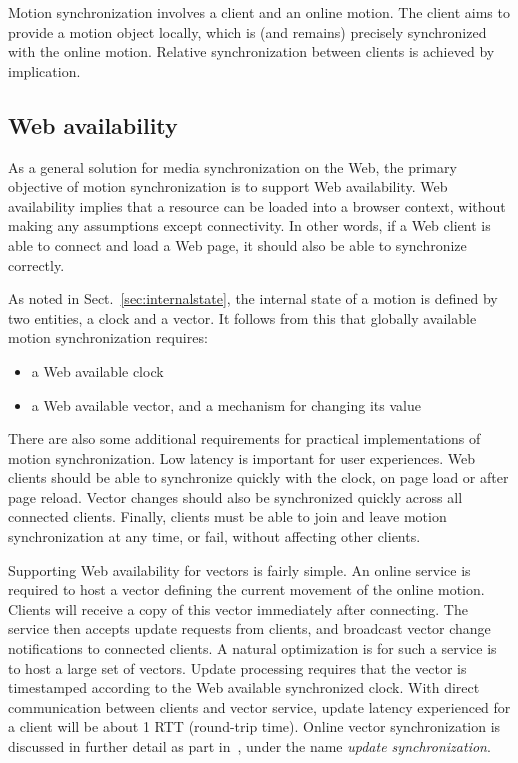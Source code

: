 Motion synchronization involves a client and an online motion. The client aims
to provide a motion object locally, which is (and remains) precisely
synchronized with the online motion. Relative synchronization between clients
is achieved by implication.

\subsection{Web availability}

As a general solution for media synchronization on the Web, the primary
objective of motion synchronization is to support Web availability. Web
availability implies that a resource can be loaded into a browser context,
without making any assumptions except connectivity. In other words, if a Web
client is able to connect and load a Web page, it should also be able to
synchronize correctly.

As noted in Sect.~\ref{sec:internalstate}, the internal state of a motion is
defined by two entities, a clock and a vector. It follows from this that
globally available motion synchronization requires:

\begin{itemize}
\item{a Web available clock}
\item{a Web available vector, and a mechanism for changing its value}
\end{itemize}

There are also some additional requirements for practical implementations of
motion synchronization. Low latency is important for user experiences. Web
clients should be able to synchronize quickly with the clock, on page load or
after page reload. Vector changes should also be synchronized quickly across
all connected clients. Finally, clients must be able to join and leave motion
synchronization at any time, or fail, without affecting other clients.


Supporting Web availability for vectors is fairly simple. An online service is
required to host a vector defining the current movement of the online motion.
Clients will receive a copy of this vector immediately after connecting. The
service then accepts update requests from clients, and broadcast vector change
notifications to connected clients. A natural optimization is for such a
service is to host a large set of vectors. Update processing requires that the
vector is timestamped according to the Web available synchronized clock. With
direct communication between clients and vector service, update latency
experienced for a client will be about 1 RTT (round-trip time). Online vector
synchronization is discussed in further detail as part in~\cite{msv}, under
the name \emph{update synchronization}.

